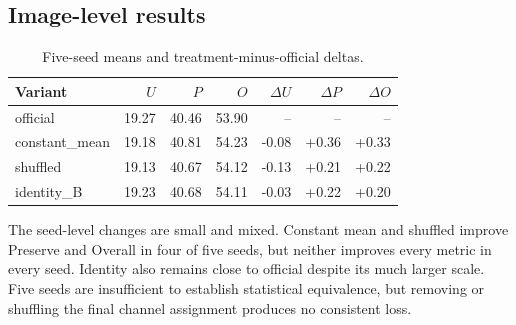 \documentclass[11pt]{article}
\begin{document}
\subsection{Image-level results}
\begin{table}[H]
\centering
\caption{Five-seed metrics. Each cell is Unlearn / Preserve / Overall (\%).}
\end{table}

\begin{table}[H]
\centering
\caption{Five-seed means and treatment-minus-official deltas.}
\begin{tabular}{lrrrrrr}
\toprule
Variant & $U$ & $P$ & $O$ & $\Delta U$ & $\Delta P$ & $\Delta O$ \\
\midrule
official & 19.27 & 40.46 & 53.90 & -- & -- & -- \\
constant\_mean & 19.18 & 40.81 & 54.23 & -0.08 & +0.36 & +0.33 \\
shuffled & 19.13 & 40.67 & 54.12 & -0.13 & +0.21 & +0.22 \\
identity\_B & 19.23 & 40.68 & 54.11 & -0.03 & +0.22 & +0.20 \\
\bottomrule
\end{tabular}
\end{table}

The seed-level changes are small and mixed. Constant mean and shuffled improve Preserve and Overall in four of five seeds, but neither improves every metric in every seed. Identity also remains close to official despite its much larger scale. Five seeds are insufficient to establish statistical equivalence, but removing or shuffling the final channel assignment produces no consistent loss.
\end{document}
